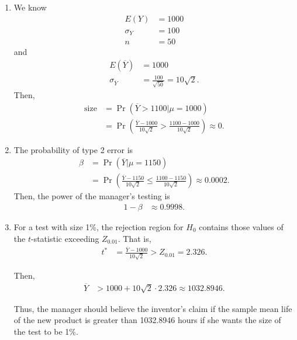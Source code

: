 \documentclass[
]{book}
\begin{document}
\begin{enumerate}
\def\labelenumi{\alph{enumi}.}
\item
  We know
  \begin{align}
        E(Y) & = 1000 \\
        \sigma_Y & = 100 \\
        n & = 50
    \end{align}
  and
  \begin{align}
        E\left(\overline{Y} \right) & = 1000 \\
        \sigma_{\overline{Y}} & = \frac{100}{\sqrt{50}}
                                = 10\sqrt{2}.
    \end{align}
  Then,
  \begin{align}
        \mbox{size} 
        & = \Pr\left( \overline{Y} > 1100 \lvert \mu = 1000 \right) \\
        & = \Pr\left( \frac{\overline{Y} - 1000}{10\sqrt{2}} > \frac{1100 - 1000}{10\sqrt{2}} \right) 
          \approx 0.
    \end{align}
\item
  The probability of type 2 error is
  \begin{align}
        \beta
        & = \Pr\left( \overline{Y} \lvert \mu = 1150 \right) \\
        & = \Pr\left( \frac{\overline{Y} - 1150}{10\sqrt{2}} \leq \frac{1100 - 1150}{10\sqrt{2}} \right) 
          \approx 0.0002.
    \end{align}
  Then, the power of the manager's testing is
  \begin{align}
        1-\beta 
        & \approx 0.9998.
    \end{align}
\item
  For a test with size 1\%, the rejection region for \(H_0\) contains those values of the \(t\)-statistic exceeding \(Z_{0.01}\). That is,
  \begin{align}
        t^* 
        & = \frac{\overline{Y} - 1000}{10\sqrt{2}}
          > Z_{0.01} = 2.326.
    \end{align}

  Then,
  \begin{align}
        \overline{Y}
        & > 1000 + 10\sqrt{2}\cdot 2.326
          \approx 1032.8946.
    \end{align}

  Thus, the manager should believe the inventor's claim if the sample mean life of the new product is greater than 1032.8946 hours if she wants the size of the test to be 1\%.
\end{enumerate}
\end{document}
